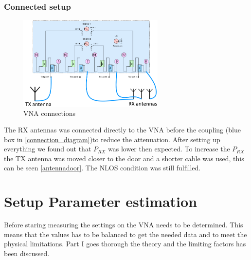 \subsection{Connected setup}
\label{connected_setup}

\begin{figure}[H]
\centering
\includegraphics[width=0.65\textwidth]{figures/Gimp_figures/4portVNA.png}
\caption{VNA connections}
\label{connection_diagram}
\end{figure}

The RX antennas was connected directly to the VNA before the coupling (blue box in \autoref{connection_diagram})to reduce the attenuation. After setting up everything we found out that $P_{RX}$ was lower then expected. To increase the $P_{RX}$ the TX antenna was moved closer to the door and a shorter cable was used, this can be seen \autoref{antennadoor}. The NLOS condition was still fulfilled. 

%
%


\chapter{Setup Parameter estimation}\label{sec:setup_parameter}
Before staring measuring the settings on the VNA needs to be determined. This means that the values has to be  balanced to get the needed data and to meet the physical limitations. Part I goes thorough the theory and the limiting factors has been discussed.


